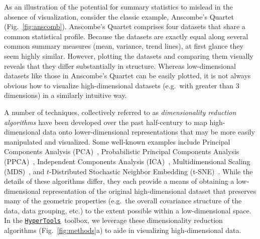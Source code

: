 \documentclass[12pt,letterpaper]{article}
\newcommand{\hypertools}{\href{https://github.com/ContextLab/hypertools}{\texttt{HyperTools}}}
\newcounter{example}
\begin{document}
As an illustration of the potential for summary statistics to mislead in the absence of visualization, consider the classic example, Anscombe's Quartet~\cite{Ansc73} (Fig.~\ref{fig:anscomb}).  Anscombe's Quartet comprises four datasets that share a common statistical profile.  Because the datasets are exactly equal along several common summary measures (mean, variance, trend lines), at first glance they seem highly similar.  However, plotting the datasets and comparing them visually reveals that they differ substantially in structure.
Whereas low-dimensional datasets like those in Anscombe's Quartet can be easily plotted, it is not always obvious how to visualize high-dimensional datasets (e.g.\ with greater than 3 dimensions) in a similarly intuitive way.

A number of techniques, collectively referred to as \textit{dimensionality reduction algorithms} have been developed over the past half-century to map high-dimensional data onto lower-dimensional representations that may be more easily manipulated and visualized.  Some well-known examples include Principal Components Analysis (PCA)~\cite{Pear01}, Probabilistic Principal Components Analysis (PPCA)~\cite{TippBish99}, Independent Components Analysis (ICA)~\cite{JuttHera91,
  ComoEtal91}, Multidimensional Scaling (MDS)~\cite{Torg58}, and $t$-Distributed Stochastic Neighbor Embedding (t-SNE)~\cite{MaatHint08}.  While the details of these algorithms differ, they each provide a means of obtaining a low-dimensional representation of the original high-dimensional dataset that preserves many of the geometric properties (e.g.\ the overall covariance structure of the data, data grouping, etc.) to the extent possible within a low-dimensional space.  In the \hypertools~toolbox, we leverage these dimensionality reduction algorithms (Fig.~\ref{fig:methods}a) to aide in visualizing high-dimensional data.
\end{document}

